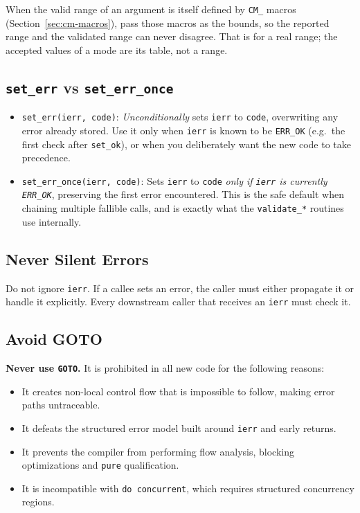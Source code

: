 \documentclass{article}
\begin{document}
When the valid range of an argument is itself defined by \texttt{CM\_} macros
(Section~\ref{sec:cm-macros}), pass those macros as the bounds, so the reported range and the
validated range can never disagree. That is for a real range; the accepted values of a mode are
its table, not a range.

\subsection{\texttt{set\_err} vs \texttt{set\_err\_once}}

\begin{itemize}
  \item \texttt{set\_err(ierr, code)}: \emph{Unconditionally} sets \texttt{ierr} to \texttt{code}, overwriting any error already stored. Use it only when \texttt{ierr} is known to be \texttt{ERR\_OK} (e.g.\ the first check after \texttt{set\_ok}), or when you deliberately want the new code to take precedence.
  \item \texttt{set\_err\_once(ierr, code)}: Sets \texttt{ierr} to \texttt{code} \emph{only if \texttt{ierr} is currently \texttt{ERR\_OK}}, preserving the first error encountered. This is the safe default when chaining multiple fallible calls, and is exactly what the \texttt{validate\_*} routines use internally.
\end{itemize}

\subsection{Never Silent Errors}

Do not ignore \texttt{ierr}. If a callee sets an error, the caller must either propagate it or handle it explicitly. Every downstream caller that receives an \texttt{ierr} must check it.

\subsection{Avoid GOTO}

\textbf{Never use \texttt{GOTO}.} It is prohibited in all new code for the following reasons:
\begin{itemize}
  \item It creates non-local control flow that is impossible to follow, making error paths untraceable.
  \item It defeats the structured error model built around \texttt{ierr} and early returns.
  \item It prevents the compiler from performing flow analysis, blocking optimizations and \texttt{pure} qualification.
  \item It is incompatible with \texttt{do concurrent}, which requires structured concurrency regions.
\end{itemize}
\end{document}
